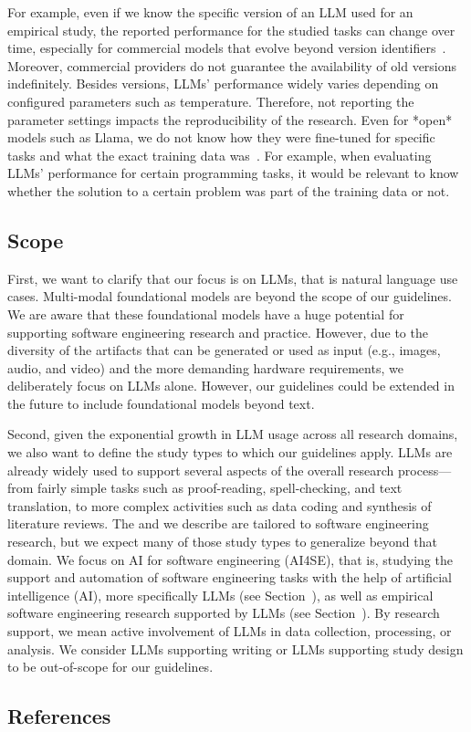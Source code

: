 For example, even if we know the specific version of an LLM used for an empirical study, the reported performance for the studied tasks can change over time, especially for commercial models that evolve beyond version identifiers~\cite{DBLP:journals/corr/abs-2307-09009}.
Moreover, commercial providers do not guarantee the availability of old versions indefinitely.
Besides versions, LLMs' performance widely varies depending on configured parameters such as temperature.
Therefore, not reporting the parameter settings impacts the reproducibility of the research.
Even for *open* models such as Llama, we do not know how they were fine-tuned for specific tasks and what the exact training data was~\cite{Gibney2024}.
For example, when evaluating LLMs' performance for certain programming tasks, it would be relevant to know whether the solution to a certain problem was part of the training data or not.


\subsection{Scope}

First, we want to clarify that our focus is on LLMs, that is natural language use cases.
Multi-modal foundational models are beyond the scope of our guidelines.
We are aware that these foundational models have a huge potential for supporting software engineering research and practice.
However, due to the diversity of  the artifacts that can be generated or used as input (e.g., images, audio, and video) and the more demanding hardware requirements, we deliberately focus on LLMs alone.
However, our guidelines could be extended in the future to include foundational models beyond text.

Second, given the exponential growth in LLM usage across all research domains, we also want to define the study types to which our guidelines apply.
LLMs are already widely used to support several aspects of the overall research process---from fairly simple tasks such as proof-reading, spell-checking, and text translation, to more complex activities such as data coding and synthesis of literature reviews.
The \studytypes and \guidelines we describe are tailored to software engineering research, but we expect many of those study types to generalize beyond that domain.
We focus on AI for software engineering (AI4SE), that is, studying the support and automation of software engineering tasks with the help of artificial intelligence (AI), more specifically LLMs (see Section~\llmsforengineers), as well as empirical software engineering research supported by LLMs (see Section~\llmsforresearcher).
By research support, we mean active involvement of LLMs in data collection, processing, or analysis.
We consider LLMs supporting writing or LLMs supporting study design to be out-of-scope for our guidelines.


\subsection{References}






